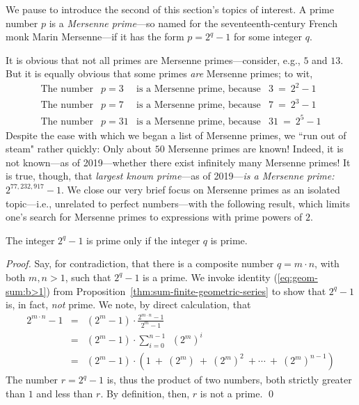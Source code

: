 \bigskip

  
We pause to introduce the second of this section's topics of interest.   A prime number $p$ is a {\it Mersenne prime}---so named for the seventeenth-century French monk Marin  Mersenne---if it has the form $p = 2^q -1$ for some integer $q$.

\smallskip

It is obvious that not all primes are Mersenne primes---consider, e.g., $5$ and $13$.  But it is equally obvious that some primes {\em are} Mersenne primes; to wit,
\begin{equation}
\label{eq:sample-mersennes}
\begin{array}{lclc}
\mbox{The number} & p=3 & 
  \mbox{is a Mersenne prime, because} & 3 \ = \ 2^2 -1 \\
\mbox{The number} & p=7 &
  \mbox{is a Mersenne prime, because} & 7 \ = \ 2^3 -1 \\
\mbox{The number} & p=31 &
  \mbox{is a Mersenne prime, because} & 31 \ = \ 2^5 -1
\end{array}
\end{equation}
Despite the ease with which we began a list of Mersenne primes,  we ``run out of steam" rather quickly:  Only about $50$ Mersenne primes are known!  Indeed, it is not known---as of 2019---whether there exist infinitely many Mersenne primes!  It is true, though, that {\em largest known prime}---as of 2019---{\em is a Mersenne prime:} $2^{77,232,917} -1$.   We close our very brief focus on Mersenne primes as an isolated topic---i.e., unrelated to perfect numbers---with the following result, which limits one's search for Mersenne primes to expressions with prime powers of $2$.

\begin{prop}
\label{thm:Mersenne-needs-prime-exponent}
The integer $2^q -1$ is prime only if the integer $q$ is prime.
\end{prop}

\begin{proof}
Say, for contradiction, that there is a composite number $q = m \cdot n$, with both $m, n > 1$, such that $2^q -1$ is a prime.  We invoke identity (\ref{eq:geom-sum:b>1}) from Proposition~\ref{thm:sum-finite-geometric-series} to show that $2^q -1$ is, in fact, {\em not} prime.  We note, by direct calculation, that
\begin{eqnarray}
\nonumber
2^{m \cdot n} -1 & = & (2^m -1) \cdot \frac{2^{m \cdot n} -1}{2^m -1} \\
\nonumber
  & = & (2^m -1) \cdot \sum_{i=0}^{n-1} \ \ (2^m)^{i} \\
\label{eq:Mersenne-factors}
  & = & (2^m -1) \cdot \left( 1 \ + \ (2^m) \ + \ (2^m)^2 \ + \cdots
            \ + \ (2^m)^{n-1} \right)
\end{eqnarray}
The number $r = 2^q - 1$ is, thus the product of two numbers, both strictly greater than $1$ and less than $r$.  By definition, then, $r$ is not a prime.  \qed
\end{proof}

